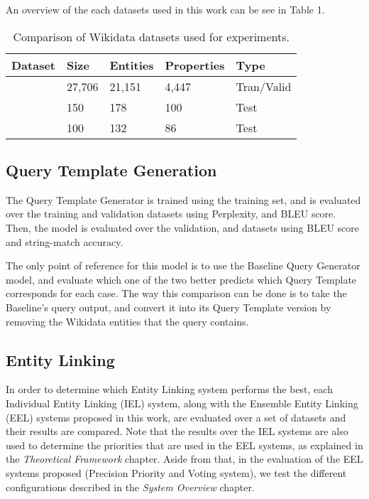 An overview of the each datasets used in this work can be see in Table 1.

\begin{table}[h!]
    \centering
    \begin{tabular}{|l|l|l|l|l|}
    \hline
    \textbf{Dataset} & \textbf{Size} & \textbf{Entities} & \textbf{Properties} & \textbf{Type} \\ \hline
    \LCQuADtwo{}        & 27,706        & 21,151            & 4,447               & Tran/Valid    \\ \hline
    \QALDseven{}           & 150           & 178               & 100                 & Test          \\ \hline
    \WikiSPARQL{}       & 100           & 132               & 86                  & Test          \\ \hline
    \end{tabular}
    \caption{Comparison of Wikidata datasets used for experiments.}
    \label{table:datasetsOverview}
\end{table}

\subsection{Query Template Generation}
\label{cap4:experimentalDesign/queryTemplateGeneration}
The Query Template Generator is trained using the \LCQuADtwo{} training set, and is evaluated over 
the training and validation datasets using Perplexity, and BLEU score. Then, the model is 
evaluated over the \LCQuADtwo{} validation, \QALDseven{} and \WikiSPARQL{} datasets using BLEU score and 
string-match accuracy.

The only point of reference for this model is to use the Baseline Query Generator model, and 
evaluate which one of the two better predicts which Query Template corresponds for each case. 
The way this comparison can be done is to take the Baseline's \SPARQL{} query output, and convert it 
into its Query Template version by removing the Wikidata entities that the query contains.

\subsection{Entity Linking}
\label{cap4:experimentalDesign/entityLinking}
In order to determine which Entity Linking system performs the best, each Individual Entity 
Linking (IEL) system, along with the Ensemble Entity Linking (EEL) systems proposed in this work, 
are evaluated over a set of datasets and their results are compared. Note that the results over 
the IEL systems are also used to determine the priorities that are used in the EEL systems, as 
explained in the \textit{Theoretical Framework} chapter. Aside from that, in the evaluation of 
the EEL systems proposed (Precision Priority and Voting system), we test the different 
configurations described in the \textit{System Overview} chapter. 


